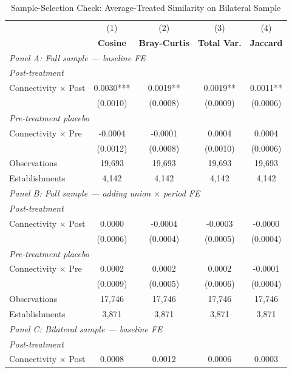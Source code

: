 \begin{table}[H]
\centering
\caption{Sample-Selection Check: Average-Treated Similarity on Bilateral Sample}
\scriptsize
\setlength{\tabcolsep}{6pt}
\begin{tabular}{lcccc}
\hline\hline
 & (1) & (2) & (3) & (4) \\
 & \textbf{Cosine} & \textbf{Bray-Curtis} & \textbf{Total Var.} & \textbf{Jaccard} \\
\hline
\multicolumn{5}{l}{\textit{Panel A: Full sample — baseline FE}} \\
\multicolumn{5}{l}{\textit{Post-treatment}} \\
Connectivity $\times$ Post & 0.0030*** & 0.0019** & 0.0019** & 0.0011** \\
 & (0.0010) & (0.0008) & (0.0009) & (0.0006) \\
\multicolumn{5}{l}{\textit{Pre-treatment placebo}} \\
Connectivity $\times$ Pre & -0.0004 & -0.0001 & 0.0004 & 0.0004 \\
 & (0.0012) & (0.0008) & (0.0010) & (0.0006) \\
\hline
Observations &       19,693 &       19,693 &       19,693 &       19,693 \\
Establishments &        4,142 &        4,142 &        4,142 &        4,142 \\
\hline
\multicolumn{5}{l}{\textit{Panel B: Full sample — adding union $\times$ period FE}} \\
\multicolumn{5}{l}{\textit{Post-treatment}} \\
Connectivity $\times$ Post & 0.0000 & -0.0004 & -0.0003 & -0.0000 \\
 & (0.0006) & (0.0004) & (0.0005) & (0.0004) \\
\multicolumn{5}{l}{\textit{Pre-treatment placebo}} \\
Connectivity $\times$ Pre & 0.0002 & 0.0002 & 0.0002 & -0.0001 \\
 & (0.0009) & (0.0005) & (0.0006) & (0.0004) \\
\hline
Observations &       17,746 &       17,746 &       17,746 &       17,746 \\
Establishments &        3,871 &        3,871 &        3,871 &        3,871 \\
\hline
\multicolumn{5}{l}{\textit{Panel C: Bilateral sample — baseline FE}} \\
\multicolumn{5}{l}{\textit{Post-treatment}} \\
Connectivity $\times$ Post & 0.0008 & 0.0012 & 0.0006 & 0.0003 \\

\end{tabular}
\end{table}
